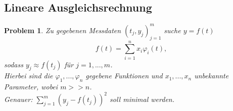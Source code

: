 \documentclass[12pt]{article}
\theoremstyle{break}
\newtheorem{comment}[theorem]{Bemerkung}
\newtheorem{problem}[theorem]{Problem}
\begin{document}
\begin{comment}
QR-Zerlegung ist bis zum Ende durchführbar, falls rang($A$) $= n$ (dann ist $\alpha_1, \alpha_2, ..., \alpha_n \neq 0$, da rang(A) = rang(R)) \\
Falls rang(A) $= k < n$ wäre bei der Rechnung ohne Rundungsfehler $\alpha_l = 0$ für ein $l$ und das Verfahren bricht ab. Modifiziere den Algorithmus deswegen:
\begin{description}
  \item[1. Schritt:] Berechne $\Vert a_1 \Vert_2, ..., \Vert a_n \Vert_2$ die Spaltennormen und vertausche die Spalten, sodass $\Vert a_1 \Vert_2$ maximal wird:
  $$Q_1AP_1 = \left[ \begin{matrix} \alpha_1 \\ 0 \\ \vdots && * & \\ 0 \end{matrix} \right], \quad \vert \alpha_1 \vert = \Vert a_1 \Vert_2$$
  usw. mit Spaltenvertauschungen in weiteren Schritten.\\
  $\Rightarrow \medspace \vert \alpha_1 \vert \geq \vert \alpha_2 \vert \geq ... \geq \vert \alpha_n \vert > 0$. Falls rang(A) $=k < n$ erhält man $\alpha_{k+1} = 0$ und
  $$\left[ \begin{array}{c|c}
    \begin{matrix} \alpha_1 & & R_1 \\ & \ddots \\ 0 && \alpha_k \end{matrix}& R_2 \\
    \hline
    0 & 0
  \end{array}\right]$$
  $AP = QR$ (numerische Rangentscheidung) \\
  falls $\frac{\vert \alpha_{k+1} \vert}{\vert \alpha_1 \vert } < 100 eps$ setze Rang($A$) $= k$.
\end{description}
\end{comment}

\subsection{Lineare Ausgleichsrechnung}

\begin{problem}
Zu gegebenen Messdaten $(t_j, y_j)_{j=1}^m$ suche $y = f(t)$
$$f(t) = \sum_{i=1}^n x_i \varphi_i(t),$$
sodass $y_j \approx f(t_j)$ für $j=1,...,m$.\\
Hierbei sind die $\varphi_1, ..., \varphi_n$ gegebene Funktionen und $x_1, ..., x_n$ unbekannte Parameter, wobei $m>>n$.\\
Genauer: $\sum_{j=1}^m (y_j - f(t_j))^2$ soll minimal werden.
\end{problem}
\end{document}
